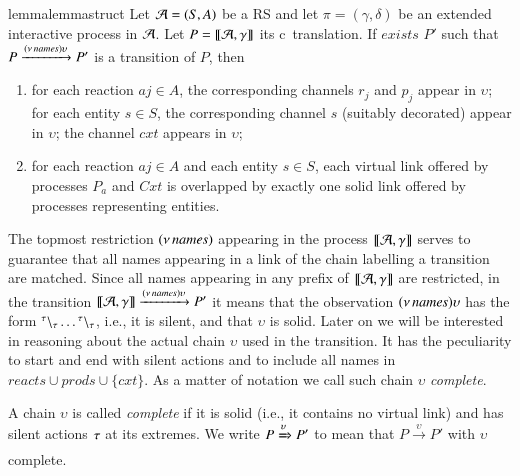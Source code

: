  \begin{restatable}[]{lemma}{lemmastruct}
 \label{lem:struct}
  Let ${\cal A} = (S, A)$ be a RS and let $\pi=(\gamma,\delta)$ be an extended  interactive process in ${\cal A}$. Let $P=\llbracket{\cal A},\gamma\rrbracket$ its c\CNA~translation. If $exists$ $P'$ such that $P \xrightarrow{(\nu\, \mathit{names})\upsilon} P'$ is a transition of $P$, then
  \begin{enumerate}
  \item for each reaction  $aj \in A$, the corresponding channels $r_j$ and $p_j$ appear in  $\upsilon$; for each entity $s \in S$, the corresponding channel $s$ (suitably decorated) appear in $\upsilon$; 
  the channel $\mathit{cxt}$ appears in $\upsilon$;
  \item for each reaction $aj \in A$ and each entity $s \in S$, each virtual link offered by processes $P_a$ and $\mathit{Cxt}$ is  overlapped by exactly one solid link offered by  processes representing entities.
  \end{enumerate}
  \end{restatable}

The topmost restriction $(\nu\, \mathit{names})$ appearing in the process $\llbracket{\cal A},\gamma\rrbracket$ serves to guarantee that all names appearing in a link of the chain labelling a transition are matched.
Since all names appearing in any prefix of $\llbracket{\cal A},\gamma\rrbracket$ are restricted, in the transition $\llbracket{\cal A},\gamma\rrbracket \xrightarrow{(\nu\, \mathit{names})\upsilon} P'$ it means that the observation $(\nu\, \mathit{names})\upsilon$ has the form ${}^{\tau} \backslash_{\tau}\dots{}^{\tau} \backslash_{\tau}$, i.e., it is silent, and that $\upsilon$ is solid. Later on we will be interested in reasoning about the actual chain $\upsilon$ used in the transition.  It has the peculiarity to start and end with silent actions and to include all names in $\mathit{reacts}\cup\mathit{prods}\cup\{\mathit{cxt}\}$. As a matter of notation we call such chain $\upsilon$ \emph{complete}. 

\begin{definition}
A chain $\upsilon$ is called \emph{complete} if it is solid (i.e., it contains no virtual link) and has silent actions $\tau$ at its extremes.
We  write $P\xRightarrow{\upsilon} P'$ to mean that $P\xrightarrow{\upsilon} P'$ with $\upsilon$ complete.
\end{definition}

